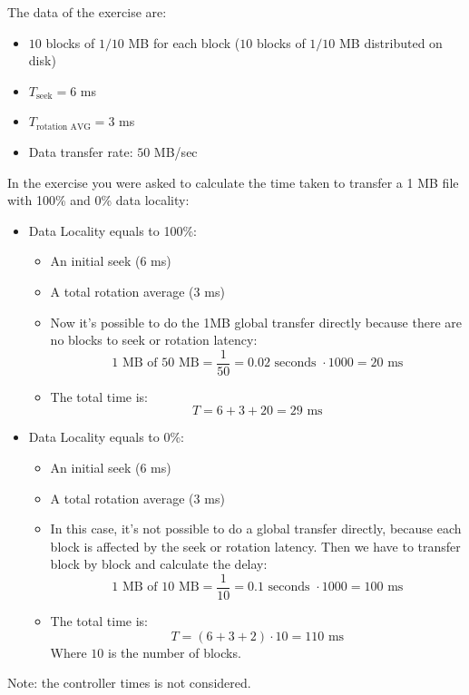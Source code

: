 \begin{exercisebox}
    The data of the exercise are:
    \begin{itemize}
        \item $10$ blocks of $1/10$ MB for each block ($10$ blocks of $1/10$ MB  distributed on disk)
        \item $T_{\text{seek}} = 6$ ms
        \item $T_{\text{rotation AVG}} = 3$ ms
        \item Data transfer rate: $50$ MB/sec
    \end{itemize}
    In the exercise you were asked to calculate the time taken to transfer a 1 MB file with 100\% and 0\% data locality:
    \begin{itemize}
        \item Data Locality equals to 100\%:
        \begin{itemize}
            \item An initial seek ($6$ ms)
            \item A total rotation average ($3$ ms)
            \item Now it's possible to do the 1MB global transfer directly because there are no blocks to seek or rotation latency:
            \begin{equation*}
                \text{1 MB of 50 MB} = \dfrac{1}{50} = 0.02 \text{ seconds } \cdot 1000 = 20 \text{ ms}
            \end{equation*}
            \item The total time is:
            \begin{equation*}
                T = 6 + 3 + 20 = 29 \text{ ms}
            \end{equation*}
        \end{itemize}

        \newpage
        \item Data Locality equals to 0\%:
        \begin{itemize}
            \item An initial seek ($6$ ms)
            \item A total rotation average ($3$ ms)
            \item In this case, it's not possible to do a global transfer directly, because each block is affected by the seek or rotation latency. Then we have to transfer block by block and calculate the delay:
            \begin{equation*}
                \text{1 MB of 10 MB} = \dfrac{1}{10} = 0.1 \text{ seconds } \cdot 1000 = 100 \text{ ms}
            \end{equation*}
            \item The total time is:
            \begin{equation*}
                T = \left(6 + 3 + 2\right) \cdot 10 = 110 \text{ ms}
            \end{equation*}
            Where $10$ is the number of blocks.
        \end{itemize}
    \end{itemize}
    Note: the controller times is not considered.
\end{exercisebox}

